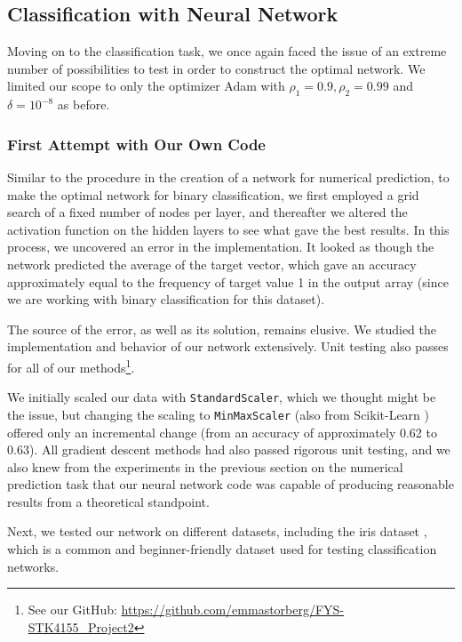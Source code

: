 \subsection{Classification with Neural Network}
Moving on to the classification task, we once again faced the issue of an extreme number of possibilities to test in order to construct the optimal network. We limited our scope to only the optimizer Adam with $\rho_1 = 0.9, \rho_2 = 0.99$ and $\delta = 10^{-8}$ as before.

\subsubsection{First Attempt with Our Own Code}
Similar to the procedure in the creation of a network for numerical prediction, to make the optimal network for binary classification, we first employed a grid search of a fixed number of nodes per layer, and thereafter we altered the activation function on the hidden layers to see what gave the best results. In this process, we uncovered an error in the implementation. It looked as though the network predicted the average of the target vector, which gave an accuracy approximately equal to the frequency of target value 1 in the output array (since we are working with binary classification for this dataset). 

The source of the error, as well as its solution, remains elusive. We studied the implementation and behavior of our network extensively. Unit testing also passes for all of our methods\footnote{See our GitHub: \url{https://github.com/emmastorberg/FYS-STK4155_Project2}}.  

We initially scaled our data with \texttt{StandardScaler}, which we thought might be the issue, but changing the scaling to \texttt{MinMaxScaler} (also from Scikit-Learn \cite{sklearnScaling}) offered only an incremental change (from an accuracy of approximately 0.62 to 0.63). All gradient descent methods had also passed rigorous unit testing, and we also knew from the experiments in the previous section on the numerical prediction task that our neural network code was capable of producing reasonable results from a theoretical standpoint. 

Next, we tested our network on different datasets, including the iris dataset \cite{irisdataset}, which is a common and beginner-friendly dataset used for testing classification networks. 

